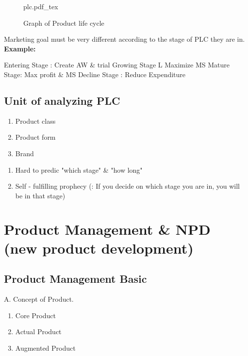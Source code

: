 \documentclass[12pt]{article}
\newcommand{\tb}{\textbf}
\begin{document}
\begin{figure}[H]
	\centering
	\def\svgwidth{\columnwidth}
	{plc.pdf_tex}
	\caption{Graph of Product life cycle}
	\label{fig:plc}
\end{figure}

Marketing goal must be very different according to the stage of PLC they are in.
\tb{Example:}


Entering Stage : Create AW \& trial
Growing Stage L Maximize MS
Mature Stage: Max profit \& MS
Decline Stage : Reduce Expenditure

\subsection{Unit of analyzing PLC}
\begin{enumerate}
	\item Product class
	\item Product form
	\item Brand
\end{enumerate}

\begin{center}
	\begin{enumerate}
		\item Hard to predic "which stage" \& "how long"
		\item Self - fulfilling prophecy (: If you decide on which stage you are in, you will be in that stage)
	\end{enumerate}

\end{center}

\section{Product Management \& NPD (new product development)}

\subsection{Product Management Basic}

A. Concept of Product.

\begin{enumerate}
	\item Core Product
	\item Actual Product
	\item Augmented Product
\end{enumerate}
\end{document}
